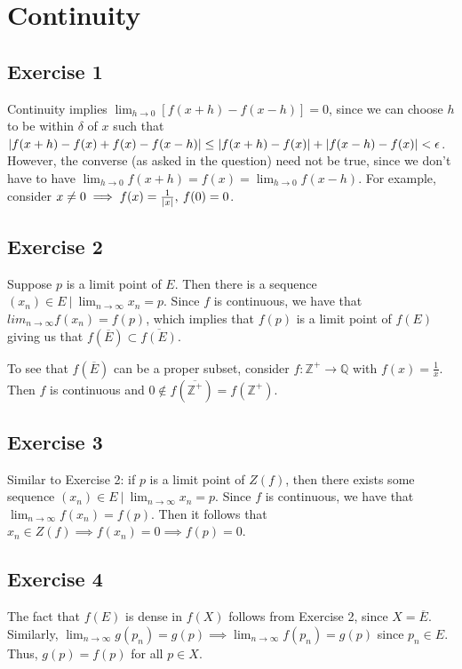 \section{Continuity}

\subsection{Exercise 1}
Continuity implies $\lim_{h \to 0} [f(x + h) - f(x - h)] = 0$, since we can choose $h$ to be within
$\delta$ of $x$ such that $\abs{f(x + h) - f(x) + f(x) - f(x - h)} \leq \abs{f(x + h) - f(x)}
+ \abs{f(x - h) - f(x)} < \epsilon$. However, the converse (as asked in the question) need not be
true, since we don't have to have $\lim_{h \to 0} f(x + h) = f(x) = \lim_{h \to 0} f(x - h)$.
For example, consider $x \neq 0 \implies f(x) = \frac{1}{\abs{x}}, \: f(0) = 0$. 

\subsection{Exercise 2}
Suppose $p$ is a limit point of $E$. Then there is a sequence $(x_n) \in E \: | \: \lim_{n \to \infty} x_n = p$.
Since $f$ is continuous, we have that $lim_{n \to \infty} f(x_n) = f(p)$, which implies that $f(p)$ is
a limit point of $f(E)$ giving us that $f(\overline{E}) \subset  \overline{f(E)}$.

To see that $f(\overline{E})$ can be a proper subset, consider $f: \mathbb{Z}^{+} \to \mathbb{Q}$ with
$f(x) = \frac{1}{x}$. Then $f$ is continuous and $0 \notin f(\overline{\mathbb{Z}^{+}}) = f(\mathbb{Z}^{+})$.

\subsection{Exercise 3}
Similar to Exercise 2: if $p$ is a limit point of $Z(f)$, then there exists some sequence $(x_n) \in E \: | \: 
\lim_{n \to \infty} x_n = p$. Since $f$ is continuous, we have that $\lim_{n \to  \infty} f(x_n) = f(p)$. 
Then it follows that $x_n \in Z(f) \implies f(x_n) = 0 \implies f(p) = 0$.

\subsection{Exercise 4}
The fact that $f(E)$ is dense in $f(X)$ follows from Exercise 2, since $X = \overline{E}$.
Similarly, $\lim_{n \to \infty} g(p_n) = g(p) \implies \lim_{n \to \infty} f(p_n) = g(p)$ 
since $p_n \in E$. Thus, $g(p) = f(p)$ for all $p \in X$.

